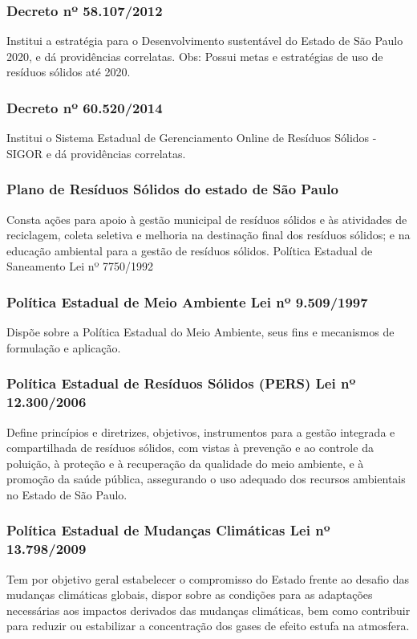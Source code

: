 \begin{subapend}
\begin{subsubapend}
		\subsubsection{Decreto nº 58.107/2012}
		Institui a estratégia para o Desenvolvimento sustentável do Estado de São Paulo 2020, e dá providências correlatas. Obs: Possui metas e estratégias de uso de resíduos sólidos até 2020.
		\subsubsection{Decreto nº 60.520/2014}
		Institui o Sistema Estadual de Gerenciamento Online de Resíduos Sólidos - SIGOR e dá providências correlatas.
		\subsubsection{Plano de Resíduos Sólidos do estado de São Paulo}
		Consta ações para apoio à gestão municipal de resíduos sólidos e às atividades de reciclagem, coleta seletiva e melhoria na destinação final dos resíduos sólidos; e na educação ambiental para a gestão de resíduos sólidos. Política Estadual de Saneamento Lei nº 7750/1992
		\subsubsection{Política Estadual de Meio Ambiente Lei nº 9.509/1997}
		Dispõe sobre a Política Estadual do Meio Ambiente, seus fins e mecanismos de formulação e aplicação.
		\subsubsection{Política Estadual de Resíduos Sólidos (PERS) Lei nº 12.300/2006}
		Define princípios e diretrizes, objetivos, instrumentos para a gestão integrada e compartilhada de resíduos sólidos, com vistas à prevenção e ao controle da poluição, à proteção e à recuperação da qualidade do meio ambiente, e à promoção da saúde pública, assegurando o uso adequado dos recursos ambientais no Estado de São Paulo.
		\subsubsection{Política Estadual de Mudanças Climáticas Lei nº 13.798/2009}
		Tem por objetivo geral estabelecer o compromisso do Estado frente ao desafio das mudanças climáticas globais, dispor sobre as condições para as adaptações necessárias aos impactos derivados das mudanças climáticas, bem como contribuir para reduzir ou estabilizar a concentração dos gases de efeito estufa na atmosfera.

\end{subsubapend}
\end{subapend}
